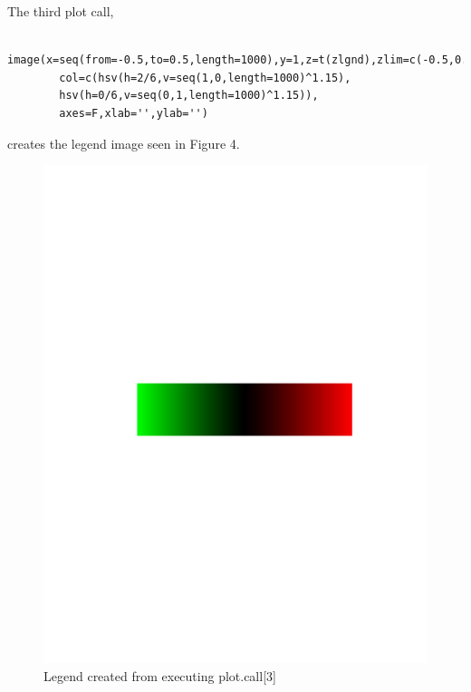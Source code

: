 \documentclass[]{article}
\begin{document}
The third plot call, 
\begin{verbatim}
  image(x=seq(from=-0.5,to=0.5,length=1000),y=1,z=t(zlgnd),zlim=c(-0.5,0.5),
        col=c(hsv(h=2/6,v=seq(1,0,length=1000)^1.15),
        hsv(h=0/6,v=seq(0,1,length=1000)^1.15)),
        axes=F,xlab='',ylab='')
\end{verbatim}
creates the legend image seen in Figure 4. 
\begin{center}
\begin{figure}
\includegraphics{legend}
\caption{Legend created from executing plot.call[3]}
\end{figure}
\end{center}
\end{document}
